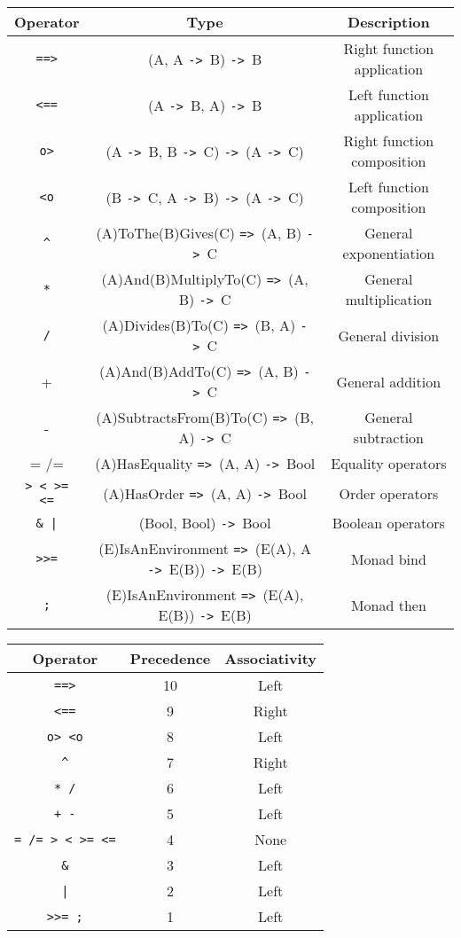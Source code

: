 \documentclass{article}
\def\ra{\texttt{->}\ }
\def\Ra{\texttt{=>}\ }
\begin{document}
\begin{center}
\begin{tabular}{ |c|c|c| } 
\hline
Operator & Type & Description \\ 
\hline
\hline
\texttt{==>} & (A, A \ra B) \ra B & Right function application \\
\hline
\texttt{<==} & (A \ra B, A) \ra B & Left function application \\
\hline
\texttt{o>} & (A \ra B, B \ra C) \ra (A \ra C) & Right function composition \\
\hline
\texttt{<o} & (B \ra C, A \ra B) \ra (A \ra C) & Left function composition \\
\hline
\texttt{\^} & (A)ToThe(B)Gives(C) \Ra (A, B) \ra C & General exponentiation  \\
\hline
\texttt{*} & (A)And(B)MultiplyTo(C) \Ra (A, B) \ra C & General multiplication  \\
\hline
\texttt{/} & (A)Divides(B)To(C) \Ra (B, A) \ra C & General division \\
\hline
+ & (A)And(B)AddTo(C) \Ra (A, B) \ra C & General addition \\ 
\hline
- & (A)SubtractsFrom(B)To(C) \Ra (B, A) \ra C & General subtraction \\
\hline
= /= & (A)HasEquality \Ra (A, A) \ra Bool & Equality operators \\
\hline
\texttt{> < >= <=} & (A)HasOrder \Ra (A, A) \ra Bool & Order operators \\
\hline
\texttt{\& |} & (Bool, Bool) \ra Bool & Boolean operators \\
\hline
\texttt{>>=} & (E)IsAnEnvironment \Ra (E(A), A \ra E(B)) \ra E(B) &
Monad bind \\
\hline
\texttt{;} & (E)IsAnEnvironment \Ra (E(A), E(B)) \ra E(B) &
Monad then \\
\hline
\end{tabular}
\end{center}

\begin{center}
\begin{tabular}{ |c|c|c| } 
\hline
Operator & Precedence & Associativity \\ 
\hline
\hline
\texttt{==>} & 10 & Left \\
\hline
\texttt{<==} & 9 & Right \\
\hline
\texttt{o> <o} & 8 & Left \\
\hline
\texttt{\^} & 7 & Right \\
\hline
\texttt{* /} & 6 & Left \\
\hline
\texttt{+ -} & 5 & Left \\ 
\hline
\texttt{= /= > < >= <=} & 4 & None \\
\hline
\texttt{\&} & 3 & Left \\
\hline
\texttt{|} & 2 & Left \\
\hline
\texttt{>>= ;} & 1 & Left \\
\hline
\end{tabular}
\end{center}
\end{document}
